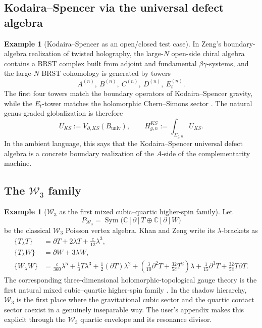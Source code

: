 \documentclass[11pt,oneside]{memoir}
\numberwithin{equation}{chapter}
\theoremstyle{definition}
\newtheorem{example}[theorem]{Example}
\newcommand{\C}{\mathbb C}
\newcommand{\Sym}{\operatorname{Sym}}
\begin{document}
\subsection{Kodaira--Spencer via the universal defect algebra}

\begin{example}[Kodaira--Spencer as an open/closed test case]
In Zeng's boundary-algebra realization of twisted holography, the large-\(N\) open-side chiral algebra contains a BRST complex built from adjoint and fundamental \(\beta\gamma\)-systems, and the large-\(N\) BRST cohomology is generated by towers
\[
A^{(n)},\ B^{(n)},\ C^{(n)},\ D^{(n)},\ E_t^{(n)}.
\]
The first four towers match the boundary operators of Kodaira--Spencer gravity, while the \(E_t\)-tower matches the holomorphic Chern--Simons sector \cite{ZengTwistedHolography}.  The natural genus-graded globalization is therefore
\[
U_{KS}:=V_{\partial,KS}(B_{\mathrm{univ}}),
\qquad
H^{KS}_{g,n}:=\int_{\Sigma_{g,n}}U_{KS}.
\]
In the ambient language, this says that the Kodaira--Spencer universal defect algebra is a concrete boundary realization of the \(A\)-side of the complementarity machine.
\end{example}

\subsection{The \texorpdfstring{$\mathcal W_3$}{W3} family}

\begin{example}[\(\mathcal W_3\) as the first mixed cubic--quartic higher-spin family]
Let
\[
P_{\mathcal W_3}=\Sym\bigl(\C[\partial]T\oplus \C[\partial]W\bigr)
\]
be the classical \(\mathcal W_3\) Poisson vertex algebra.  Khan and Zeng write its \(\lambda\)-brackets as
\begin{align*}
\{T_\lambda T\}&=\partial T+2\lambda T+\frac{c}{12}\lambda^3,
\\
\{T_\lambda W\}&=\partial W+3\lambda W,
\\
\{W_\lambda W\}&=\frac{c}{360}\lambda^5+
\frac13T\lambda^3+
\frac12(\partial T)\lambda^2+
\left(\frac{3}{10}\partial^2T+\frac{32}{5c}T^2\right)\lambda+
\frac1{15}\partial^3T+\frac{32}{5c}T\partial T.
\end{align*}
The corresponding three-dimensional holomorphic-topological gauge theory is the first natural mixed cubic--quartic higher-spin family \cite{KhanZengPVA}.  In the shadow hierarchy, \(\mathcal W_3\) is the first place where the gravitational cubic sector and the quartic contact sector coexist in a genuinely inseparable way.  The user's appendix makes this explicit through the \(\mathcal W_3\) quartic envelope and its resonance divisor.
\end{example}
\end{document}
